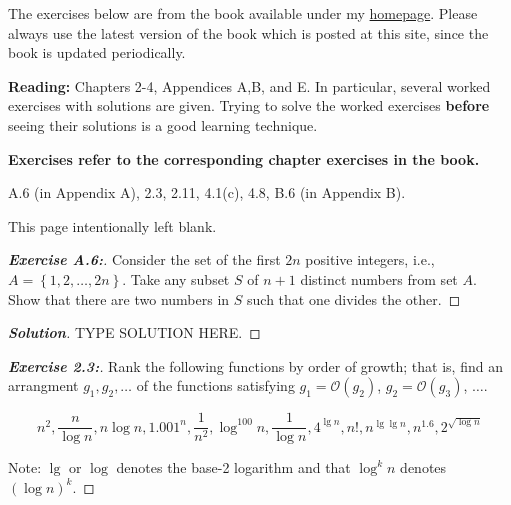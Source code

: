 \documentclass[a4paper]{article}
\newenvironment{solution}{\begin{proof}[\textnormal{\textbf{Solution}}]}{\end{proof}}
\newenvironment{exercise}[1]{\begin{proof}[\textnormal{\textbf{Exercise #1:}}]\renewcommand{\qedsymbol}{}}{\end{proof}}
\newcommand{\bigO}[1]{\mathcal{O}\left(#1\right)}
\newcommand{\set}[1]{\left\lbrace#1\right\rbrace}
\begin{document}
\begin{titlepage}
    The exercises below are from the book available under my \href{https://sites.google.com/site/gopalpandurangan/home/algorithms-course}{homepage}. Please always use the latest version of the book which is posted at this site, since the book is updated periodically.

    \medskip

    \textbf{Reading:} Chapters  2-4, Appendices A,B, and E. In particular, several worked exercises with solutions are given. Trying to solve the worked exercises \textbf{before} seeing their solutions is a good learning technique.
    \medskip

    \textbf{Exercises refer to the corresponding chapter exercises in the book.}

    A.6 (in Appendix A), 2.3, 2.11, 4.1(c), 4.8, B.6 (in Appendix B).
    \vfill



\end{titlepage}
\vspace*{\fill}\begin{center}{\Huge This page intentionally left blank.}\end{center}\vspace*{\fill}\thispagestyle{empty}\clearpage
{}

\begin{exercise}{A.6}
    Consider the set of the first \(2n\) positive integers, i.e., \(A = \set{1, 2, \hdots, 2n}\). Take any subset \(S\) of \(n + 1\) distinct numbers from set \(A\). Show that there are two numbers in \(S\) such that one divides the other.
\end{exercise}

\begin{solution}
    TYPE SOLUTION HERE.
\end{solution}

\begin{exercise}{2.3}
    Rank the following functions by order of growth; that is, find an arrangment \(g_1, g_2, \hdots\) of the functions satisfying \(g_1 = \bigO{g_2}\), \(g_2 = \bigO{g_3}\), \(\hdots\).

    \[n^2, \frac{n}{\log{n}}, n\log{n}, 1.001^n, \frac{1}{n^2}, \log^{100}{n}, \frac{1}{\log{n}}, 4^{\lg{n}}, n!, n^{\lg{\lg{n}}}, n^{1.6}, 2^{\sqrt{\log{n}}}\]

    Note: \(\lg\) or \(\log\) denotes the base-2 logarithm and that \(\log^k{n}\) denotes \((\log{n})^k\).
\end{exercise}
\end{document}
